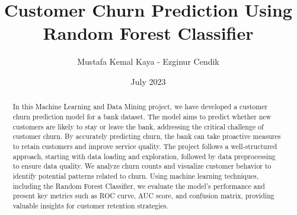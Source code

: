 \documentclass{article}
\title{Customer Churn Prediction Using Random Forest Classifier}
\author{Mustafa Kemal Kaya - Ezginur Cendik}
\date{July 2023}
\begin{document}
\maketitle
\begin{abstract}

In this Machine Learning and Data Mining project, we have developed a customer churn prediction model for a bank dataset. The model aims to predict whether new customers are likely to stay or leave the bank, addressing the critical challenge of customer churn. By accurately predicting churn, the bank can take proactive measures to retain customers and improve service quality. The project follows a well-structured approach, starting with data loading and exploration, followed by data preprocessing to ensure data quality. We analyze churn counts and visualize customer behavior to identify potential patterns related to churn. Using machine learning techniques, including the Random Forest Classifier, we evaluate the model's performance and present key metrics such as ROC curve, AUC score, and confusion matrix, providing valuable insights for customer retention strategies.

\end{abstract}
\end{document}
